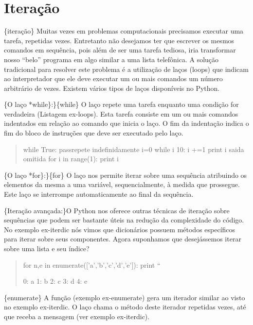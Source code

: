\documentclass[a4paper,10pt,portuguese]{sphinxmanual}
\begin{document}
\section{Iteração}
\label{Cap2:iteracao}
\{iteração\} Muitas vezes em problemas computacionais precisamos
executar uma tarefa, repetidas vezes. Entretanto não desejamos ter
que escrever os mesmos comandos em sequência, pois além de ser uma
tarefa tediosa, iria transformar nosso ``belo'' programa em algo
similar a uma lista telefônica. A solução tradicional para resolver
este problema é a utilização de laços (loops) que indicam ao
interpretador que ele deve executar um ou mais comandos um número
arbitrário de vezes. Existem vários tipos de laços disponíveis no
Python.

\{O laço *while\}:\}\{while\} O laço  repete uma tarefa
enquanto uma condição for verdadeira (Listagem ex-loops). Esta
tarefa consiste em um ou mais comandos indentados em relação ao
comando que inicia o laço. O fim da indentação indica o fim do
bloco de instruções que deve ser executado pelo laço.
\begin{quote}

while True: passrepete indefinidamente i=0 while i 10: i +=1 print
i saida omitida for i in range(1): print i
\end{quote}

\{O laço *for\}:\}\{for\} O laço  nos permite iterar
sobre uma sequência atribuindo os elementos da mesma a uma
variável, sequencialmente, à medida que prossegue. Este laço se
interrompe automaticamente ao final da sequência.

\{Iteração avançada:\}O Python nos oferece outras técnicas de
iteração sobre sequências que podem ser bastante úteis na redução
da complexidade do código. No exemplo ex-iterdic nós vimos que
dicionários possuem métodos específicos para iterar sobre seus
componentes. Agora suponhamos que desejássemos iterar sobre uma
lista e seu índice?
\begin{quote}

for n,e in enumerate({[}'a','b','c','d','e'{]}): print ``

0: a 1: b 2: c 3: d 4: e
\end{quote}

\{enumerate\} A função  (exemplo ex-enumerate) gera um
iterador similar ao visto no exemplo ex-iterdic. O laço 
chama o método  deste iterador repetidas vezes, até que
receba a mensagem  (ver exemplo ex-iterdic).
\end{document}
